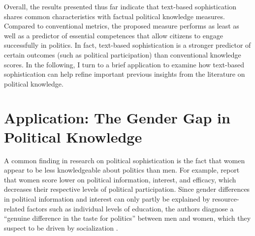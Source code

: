 \documentclass[12pt]{article}
\begin{document}
Overall, the results presented thus far indicate that text-based sophistication shares common characteristics with factual political knowledge measures. Compared to conventional metrics, the proposed measure performs as least as well as a predictor of essential competences that allow citizens to engage successfully in politics. In fact, text-based sophistication is a stronger predictor of certain outcomes (such as political participation) than conventional knowledge scores. In the following, I turn to a brief application to examine how text-based sophistication can help refine important previous insights from the literature on political knowledge.



\section*{Application: The Gender Gap in Political Knowledge}



A common finding in research on political sophistication is the fact that women appear to be less knowledgeable about politics than men. For example, \citet{verba1997knowing} report that women score lower on political information, interest, and efficacy, which decreases their respective levels of political participation. Since gender differences in political information and interest can only partly be explained by resource-related factors such as individual levels of education, the authors diagnose a ``genuine difference in the taste for politics'' between men and women, which they suspect to be driven by socialization \citep[see also][]{wolak2011roots}.
\end{document}
